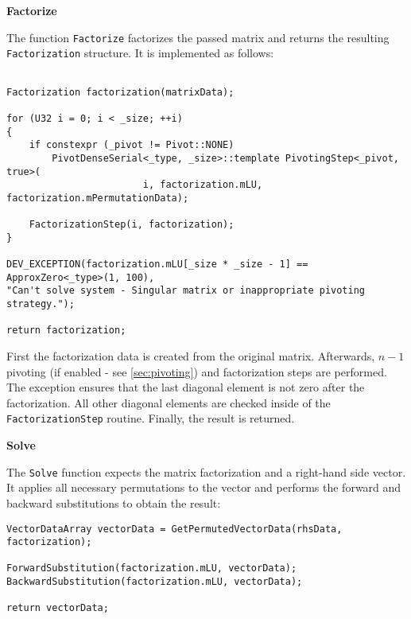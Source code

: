 \vspace{1cm}
\textbf{Factorize}
\vspace{0.5cm}

The function \texttt{Factorize} factorizes the passed matrix and returns the resulting \texttt{Factorization} structure.
It is implemented as follows:
\begin{verbatim}

Factorization factorization(matrixData);

for (U32 i = 0; i < _size; ++i)
{
    if constexpr (_pivot != Pivot::NONE)
        PivotDenseSerial<_type, _size>::template PivotingStep<_pivot, true>(
                        i, factorization.mLU, factorization.mPermutationData);
                            
    FactorizationStep(i, factorization);
}
    
DEV_EXCEPTION(factorization.mLU[_size * _size - 1] == ApproxZero<_type>(1, 100),
"Can't solve system - Singular matrix or inappropriate pivoting strategy.");

return factorization;
\end{verbatim}

First the factorization data is created from the original matrix.
Afterwards, $n-1$ pivoting (if enabled - see \cref{sec:pivoting}) and factorization steps are performed.
The exception ensures that the last diagonal element is not zero after the factorization.
All other diagonal elements are checked inside of the \texttt{FactorizationStep} routine.
Finally, the result is returned.





\vspace{1cm}
\textbf{Solve}
\vspace{0.5cm}

The \texttt{Solve} function expects the matrix factorization and a right-hand side vector.
It applies all necessary permutations to the vector and performs the forward and backward substitutions to obtain the result:

\begin{verbatim}
VectorDataArray vectorData = GetPermutedVectorData(rhsData, factorization);

ForwardSubstitution(factorization.mLU, vectorData);
BackwardSubstitution(factorization.mLU, vectorData);

return vectorData;
\end{verbatim}


